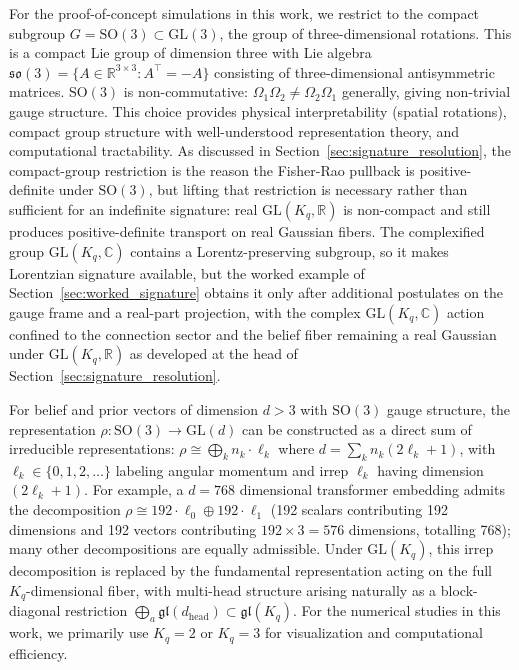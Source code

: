 \documentclass[11pt]{article}
\begin{document}
For the proof-of-concept simulations in this work, we restrict to the compact subgroup $G = \mathrm{SO}(3) \subset \mathrm{GL}(3)$, the group of three-dimensional rotations. This is a compact Lie group of dimension three with Lie algebra $\mathfrak{so}(3) = \{A \in \mathbb{R}^{3 \times 3} : A^\top = -A\}$ consisting of three-dimensional antisymmetric matrices. $\mathrm{SO}(3)$ is non-commutative: $\Omega_1 \Omega_2 \neq \Omega_2 \Omega_1$ generally, giving non-trivial gauge structure. This choice provides physical interpretability (spatial rotations), compact group structure with well-understood representation theory, and computational tractability. As discussed in Section~\ref{sec:signature_resolution}, the compact-group restriction is the reason the Fisher-Rao pullback is positive-definite under $\mathrm{SO}(3)$, but lifting that restriction is necessary rather than sufficient for an indefinite signature: real $\mathrm{GL}(K_q, \mathbb{R})$ is non-compact and still produces positive-definite transport on real Gaussian fibers. The complexified group $\mathrm{GL}(K_q, \mathbb{C})$ contains a Lorentz-preserving subgroup, so it makes Lorentzian signature available, but the worked example of Section~\ref{sec:worked_signature} obtains it only after additional postulates on the gauge frame and a real-part projection, with the complex $\mathrm{GL}(K_q, \mathbb{C})$ action confined to the connection sector and the belief fiber remaining a real Gaussian under $\mathrm{GL}(K_q, \mathbb{R})$ as developed at the head of Section~\ref{sec:signature_resolution}.

For belief and prior vectors of dimension $d > 3$ with $\mathrm{SO}(3)$ gauge structure, the representation $\rho: \mathrm{SO}(3) \to \mathrm{GL}(d)$ can be constructed as a direct sum of irreducible representations: $\rho \cong \bigoplus_{k} n_k \cdot \ell_k$ where $d = \sum_{k} n_k(2\ell_k + 1)$, with $\ell_k \in \{0,1,2,\ldots\}$ labeling angular momentum and irrep $\ell_k$ having dimension $(2\ell_k + 1)$. For example, a $d=768$ dimensional transformer embedding admits the decomposition $\rho \cong 192 \cdot \ell_0 \oplus 192 \cdot \ell_1$ (192 scalars contributing 192 dimensions and 192 vectors contributing $192 \times 3 = 576$ dimensions, totalling 768); many other decompositions are equally admissible. Under $\mathrm{GL}(K_q)$, this irrep decomposition is replaced by the fundamental representation acting on the full $K_q$-dimensional fiber, with multi-head structure arising naturally as a block-diagonal restriction $\bigoplus_a \mathfrak{gl}(d_{\mathrm{head}}) \subset \mathfrak{gl}(K_q)$. For the numerical studies in this work, we primarily use $K_q=2$ or $K_q=3$ for visualization and computational efficiency.
\end{document}
